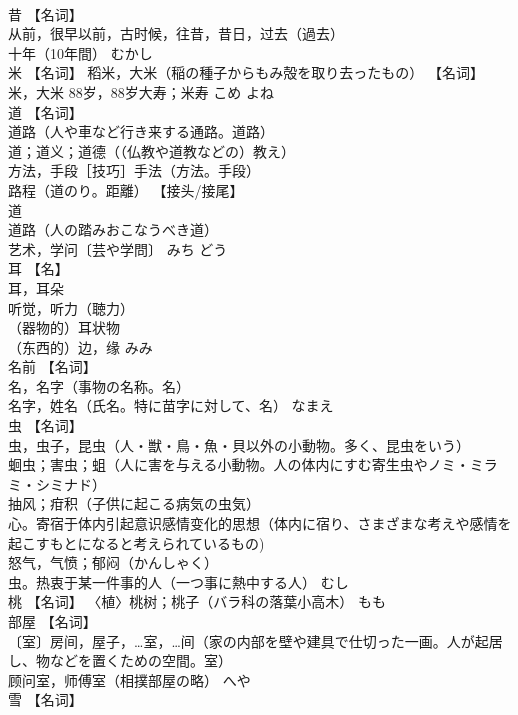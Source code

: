 \documentclass[8pt]{extreport}
\begin{document}
\begin{CJK}{UTF8}{min}
\\	昔	【名词】 
\\	从前，很早以前，古时候，往昔，昔日，过去（過去） 
\\	十年（10年間）	むかし	
\\	米	【名词】 稻米，大米（稲の種子からもみ殻を取り去ったもの） 【名词】 米，大米 88岁，88岁大寿；米寿	こめ よね	
\\	道	【名词】 
\\	道路（人や車など行き来する通路。道路） 
\\	道；道义；道德（（仏教や道教などの）教え） 
\\	方法，手段［技巧］手法（方法。手段） 
\\	路程（道のり。距離） 【接头/接尾】 
\\	道 
\\	道路（人の踏みおこなうべき道） 
\\	艺术，学问〔芸や学問〕	みち どう	
\\	耳	【名】 
\\	耳，耳朵 
\\	听觉，听力（聴力） 
\\	（器物的）耳状物 
\\	（东西的）边，缘	みみ	
\\	名前	【名词】 
\\	名，名字（事物の名称。名） 
\\	名字，姓名（氏名。特に苗字に対して、名）	なまえ	
\\	虫	【名词】 
\\	虫，虫子，昆虫（人・獣・鳥・魚・貝以外の小動物。多く、昆虫をいう） 
\\	蛔虫；害虫；蛆（人に害を与える小動物。人の体内にすむ寄生虫やノミ・ミラミ・シミナド） 
\\	抽风；疳积（子供に起こる病気の虫気） 
\\	心。寄宿于体内引起意识感情变化的思想（体内に宿り、さまざまな考えや感情を起こすもとになると考えられているもの) 
\\	怒气，气愤；郁闷（かんしゃく） 
\\	虫。热衷于某一件事的人（一つ事に熱中する人）	むし	
\\	桃	【名词】 〈植〉桃树；桃子（バラ科の落葉小高木）	もも	
\\	部屋	【名词】 
\\	〔室〕房间，屋子，…室，…间（家の内部を壁や建具で仕切った一画。人が起居し、物などを置くための空間。室） 
\\	顾问室，师傅室（相撲部屋の略）	へや	
\\	雪	【名词】 

\end{CJK}
\end{document}

